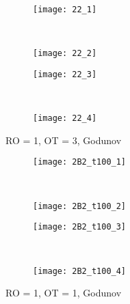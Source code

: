 \documentclass[10pt,letterpaper,fleqn]{article}
\begin{document}
\begin{figure}[h!]
        \centering
        \begin{subfigure}[b]{0.4\textwidth}
                \texttt{[image: 22\_1]}
        \end{subfigure}%
        ~ 
        \begin{subfigure}[b]{0.4\textwidth}
                \texttt{[image: 22\_2]}
        \end{subfigure}
        
        \begin{subfigure}[b]{0.4\textwidth}
                \texttt{[image: 22\_3]}
        \end{subfigure}
        ~
        \begin{subfigure}[b]{0.4\textwidth}
                \texttt{[image: 22\_4]}
        \end{subfigure}
        \caption{RO = 1, OT = 3, Godunov}
\end{figure}

\begin{figure}[h!]
        \centering
        \begin{subfigure}[b]{0.4\textwidth}
                \texttt{[image: 2B2\_t100\_1]}
        \end{subfigure}%
        ~ 
        \begin{subfigure}[b]{0.4\textwidth}
                \texttt{[image: 2B2\_t100\_2]}
        \end{subfigure}
        
        \begin{subfigure}[b]{0.4\textwidth}
                \texttt{[image: 2B2\_t100\_3]}
        \end{subfigure}
        ~
        \begin{subfigure}[b]{0.4\textwidth}
                \texttt{[image: 2B2\_t100\_4]}
        \end{subfigure}
        \caption{RO = 1, OT = 1, Godunov}
\end{figure}
\end{document}
